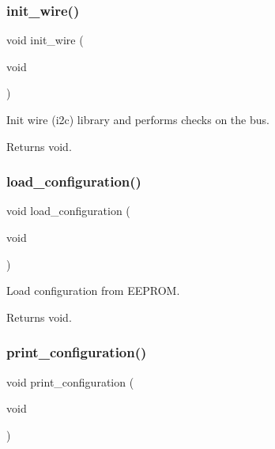 \subsubsection{\texorpdfstring{init\+\_\+wire()}{init\_wire()}}
{\footnotesize\ttfamily void init\+\_\+wire (\begin{DoxyParamCaption}\item[{void}]{ }\end{DoxyParamCaption})}



Init wire (i2c) library and performs checks on the bus. 

\begin{DoxyReturn}{Returns}
void. 
\end{DoxyReturn}
\mbox{\label{i2c-rain_8ino_a32a64a2800c724fb28e10636f2ec20b9}} 
\subsubsection{\texorpdfstring{load\+\_\+configuration()}{load\_configuration()}}
{\footnotesize\ttfamily void load\+\_\+configuration (\begin{DoxyParamCaption}\item[{void}]{ }\end{DoxyParamCaption})}



Load configuration from E\+E\+P\+R\+OM. 

\begin{DoxyReturn}{Returns}
void. 
\end{DoxyReturn}
\mbox{\label{i2c-rain_8ino_a65b2dadc0411e43874ec8ed7f73bc62a}} 
\subsubsection{\texorpdfstring{print\+\_\+configuration()}{print\_configuration()}}
{\footnotesize\ttfamily void print\+\_\+configuration (\begin{DoxyParamCaption}\item[{void}]{ }\end{DoxyParamCaption})}



